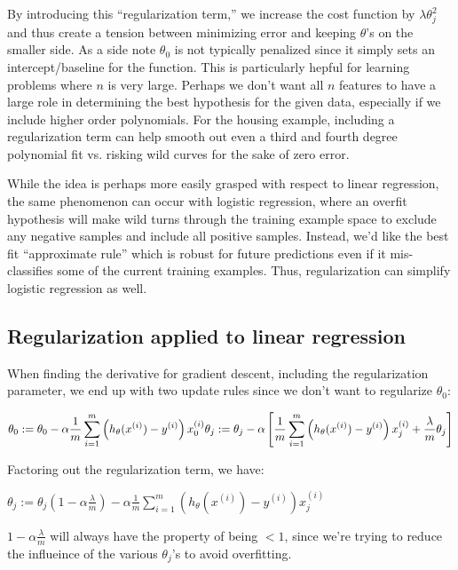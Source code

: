 \documentclass[11pt]{article}
\begin{document}
By introducing this ``regularization term,'' we increase the cost function by \(\lambda
\theta^2_j\) and thus create a tension between minimizing error and keeping
\(\theta\)'s on the smaller side. As a side note \(\theta_0\) is not typically
penalized since it simply sets an intercept/baseline for the function. This is
particularly hepful for learning problems where \(n\) is very large. Perhaps we don't
want all \(n\) features to have a large role in determining the best hypothesis for
the given data, especially if we include higher order polynomials. For the housing
example, including a regularization term can help smooth out even a third and fourth
degree polynomial fit vs. risking wild curves for the sake of zero error.

While the idea is perhaps more easily grasped with respect to linear regression, the
same phenomenon can occur with logistic regression, where an overfit hypothesis will
make wild turns through the training example space to exclude any negative samples
and include all positive samples. Instead, we'd like the best fit ``approximate rule''
which is robust for future predictions even if it mis-classifies some of the current
training examples. Thus, regularization can simplify logistic regression as well.
\subsection{Regularization applied to linear regression}
\label{sec-4-2}


When finding the derivative for gradient descent, including the regularization
parameter, we end up with two update rules since we don't want to regularize
\(\theta_0\):

\( \displaystyle
\theta_0 := \theta_0 - \alpha \frac{1}{m} \sum_{i=1}^m \left( h_\theta(x^{(i)}) -
y^{(i)} \right)x^{(i)}_0 \\
\theta_j := \theta_j - \alpha \left[ \frac{1}{m} \sum_{i=1}^m \left( h_\theta(x^{(i)}) -
y^{(i)} \right)x^{(i)}_j + \frac{\lambda}{m} \theta_j \right]
\)

Factoring out the regularization term, we have:

\( \displaystyle
\theta_j := \theta_j(1 - \alpha \frac{\lambda}{m}) - \alpha \frac{1}{m} \sum_{i=1}^m \left( h_\theta(x^{(i)}) -
y^{(i)} \right)x^{(i)}_j
\)

\(1 - \alpha \frac{\lambda}{m}\) will always have the property of being \(< 1\),
since we're trying to reduce the influeince of the various \(\theta_j\)'s to avoid
overfitting.
\end{document}
